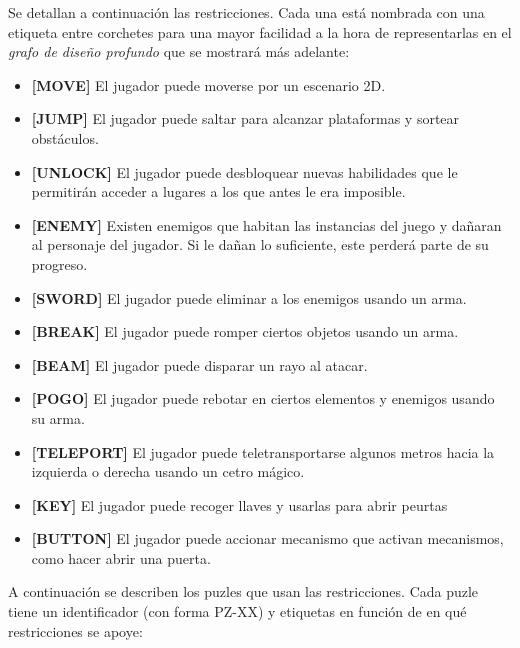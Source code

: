 Se detallan a continuación las restricciones. Cada una está nombrada con una etiqueta entre corchetes para una mayor facilidad a la hora de representarlas en el \textit{grafo de diseño profundo} que se mostrará más adelante:

\begin{itemize}
    \item \textbf{[MOVE]} El jugador puede moverse por un escenario 2D.
    \item \textbf{[JUMP]} El jugador puede saltar para alcanzar plataformas y sortear obstáculos.
    \item \textbf{[UNLOCK]} El jugador puede desbloquear nuevas habilidades que le permitirán acceder a lugares a los que antes le era imposible.
    \item \textbf{[ENEMY]} Existen enemigos que habitan las instancias del juego y dañaran al personaje del jugador. Si le dañan lo suficiente, este perderá parte de su progreso.
    \item \textbf{[SWORD]} El jugador puede eliminar a los enemigos usando un arma.
    \item \textbf{[BREAK]} El jugador puede romper ciertos objetos usando un arma.
    \item \textbf{[BEAM]} El jugador puede disparar un rayo al atacar.
    \item \textbf{[POGO]} El jugador puede rebotar en ciertos elementos y enemigos usando su arma.
    \item \textbf{[TELEPORT]} El jugador puede teletransportarse algunos metros hacia la izquierda o derecha usando un cetro mágico.
    \item \textbf{[KEY]} El jugador puede recoger llaves y usarlas para abrir peurtas
    \item \textbf{[BUTTON]} El jugador puede accionar mecanismo que activan mecanismos, como hacer abrir una puerta.
\end{itemize}

A continuación se describen los puzles que usan las restricciones. Cada puzle tiene un identificador (con forma PZ-XX) y etiquetas en función de en qué restricciones se apoye:

